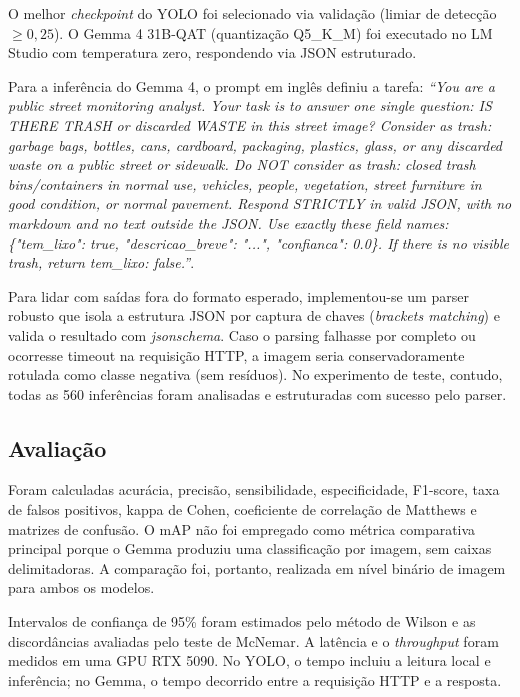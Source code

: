 \documentclass[kdmile,a4paper]{kdmile}
\begin{document}
O melhor \emph{checkpoint} do YOLO foi selecionado via validação (limiar de detecção $\ge 0,25$). O Gemma 4 31B-QAT (quantização Q5\_K\_M) foi executado no LM Studio com temperatura zero, respondendo via JSON estruturado. 

Para a inferência do Gemma 4, o prompt em inglês definiu a tarefa: \emph{``You are a public street monitoring analyst. Your task is to answer one single question: IS THERE TRASH or discarded WASTE in this street image? Consider as trash: garbage bags, bottles, cans, cardboard, packaging, plastics, glass, or any discarded waste on a public street or sidewalk. Do NOT consider as trash: closed trash bins/containers in normal use, vehicles, people, vegetation, street furniture in good condition, or normal pavement. Respond STRICTLY in valid JSON, with no markdown and no text outside the JSON. Use exactly these field names: \{"tem\_lixo": true, "descricao\_breve": "...", "confianca": 0.0\}. If there is no visible trash, return tem\_lixo: false.''}. 

Para lidar com saídas fora do formato esperado, implementou-se um parser robusto que isola a estrutura JSON por captura de chaves (\emph{brackets matching}) e valida o resultado com \emph{jsonschema}. Caso o parsing falhasse por completo ou ocorresse timeout na requisição HTTP, a imagem seria conservadoramente rotulada como classe negativa (sem resíduos). No experimento de teste, contudo, todas as 560 inferências foram analisadas e estruturadas com sucesso pelo parser.

\subsection{Avaliação}
\label{sec:avaliacao}

Foram calculadas acurácia, precisão, sensibilidade, especificidade, F1-score, taxa de falsos positivos, kappa de Cohen, coeficiente de correlação de Matthews e matrizes de confusão. O mAP não foi empregado como métrica comparativa principal porque o Gemma produziu uma classificação por imagem, sem caixas delimitadoras. A comparação foi, portanto, realizada em nível binário de imagem para ambos os modelos.

Intervalos de confiança de 95\% foram estimados pelo método de Wilson e as discordâncias avaliadas pelo teste de McNemar. A latência e o \emph{throughput} foram medidos em uma GPU RTX 5090. No YOLO, o tempo incluiu a leitura local e inferência; no Gemma, o tempo decorrido entre a requisição HTTP e a resposta.
\end{document}
